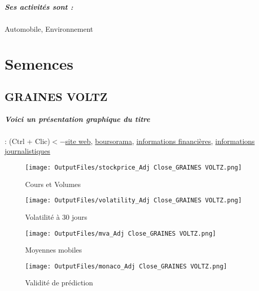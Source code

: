 \documentclass[11pt,a4paper]{report}%
\begin{document}
\paragraph{Ses activités sont : } Automobile, Environnement 
    
    \newpage\chapter{Semences}


\section{GRAINES VOLTZ}

\paragraph{Voici un présentation graphique du titre} : (Ctrl + Clic)$<-$\href{https://www.graines-voltz.com/informations-financieres/}{site web}, \href{https://www.boursorama.com/cours/1rPGRVO}{boursorama}, \href{https://www.qwant.com/?q=site:https:%2f%2fwww.easybourse.com%2faction-societe%2fGRAINES-VOLTZ&t=web&client=ext-firefox-hp}{informations financières}, \href{https://bourse.lerevenu.com/cours-de-bourse/fiche-valeur-synthese/GRAINES-VOLTZ/GRVO-FR}{informations journalistiques}
\begin{figure}[!htb]
   \begin{minipage}{0.5\textwidth}
     \centering
     \texttt{[image: OutputFiles/stockprice\_Adj Close\_GRAINES VOLTZ.png]}
     \caption{Cours et Volumes}\label{Fig:price_GRAINES VOLTZ}
   \end{minipage}\hfill
   \begin{minipage}{0.5\textwidth}
     \centering
     \texttt{[image: OutputFiles/volatility\_Adj Close\_GRAINES VOLTZ.png]}
     \caption{Volatilité à 30 jours}\label{Fig:volat_GRAINES VOLTZ}
   \end{minipage}
\end{figure}
\begin{figure}[!htb]
   \begin{minipage}{0.5\textwidth}
     \centering
     \texttt{[image: OutputFiles/mva\_Adj Close\_GRAINES VOLTZ.png]}
     \caption{Moyennes mobiles}\label{Fig:mva_GRAINES VOLTZ}
   \end{minipage}\hfill
   \begin{minipage}{0.5\textwidth}
     \centering
     \texttt{[image: OutputFiles/monaco\_Adj Close\_GRAINES VOLTZ.png]}
     \caption{Validité de prédiction}\label{Fig:prediction_GRAINES VOLTZ}
   \end{minipage}
\end{figure}
\end{document}
